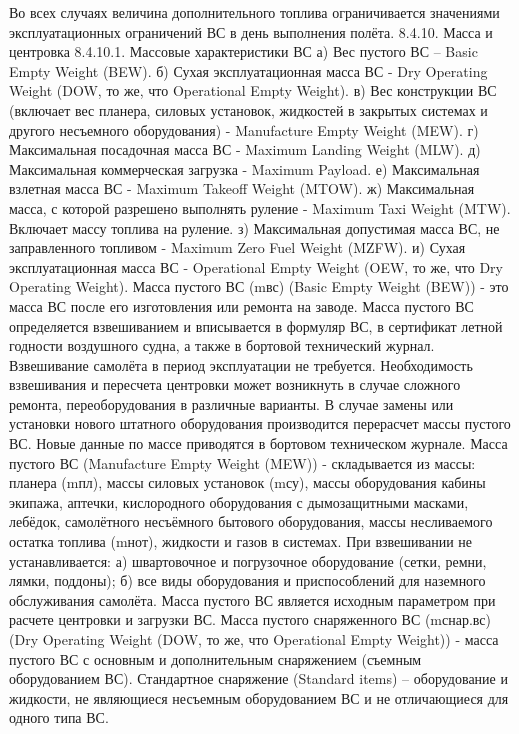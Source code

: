 Во всех случаях величина дополнительного топлива ограничивается значениями эксплуатационных ограничений ВС в день выполнения полёта.
8.4.10. Масса и центровка
8.4.10.1. Массовые характеристики ВС
а)	Вес пустого ВС – Basic Empty Weight (BEW). 
б)	Сухая эксплуатационная масса ВС - Dry Operating Weight (DOW, то же, что Operational Empty Weight). 
в)	Вес конструкции ВС (включает вес планера, силовых установок, жидкостей в закрытых системах и другого несъемного оборудования) - Manufacture Empty Weight (MEW).
г)	Максимальная посадочная масса ВС - Maximum Landing Weight (MLW).
д)	Максимальная коммерческая загрузка - Maximum Payload. 
е)	Максимальная взлетная масса ВС - Maximum Takeoff Weight (MTOW).
ж)	Максимальная масса, с которой разрешено выполнять руление - Maximum Taxi Weight (MTW). 
Включает массу топлива на руление.
з)	Максимальная допустимая масса ВС, не заправленного топливом - Maximum Zero Fuel Weight (MZFW).
и)	Сухая эксплуатационная масса ВС - Operational Empty Weight (OEW, то же, что Dry Operating Weight).
Масса пустого ВС (mвс) (Basic Empty Weight (BEW)) - это масса ВС после его изготовления или ремонта на заводе. Масса пустого ВС определяется взвешиванием и вписывается в формуляр ВС, в сертификат летной годности воздушного судна, а также в бортовой технический журнал. Взвешивание самолёта в период эксплуатации не требуется. Необходимость взвешивания и пересчета центровки может возникнуть в случае сложного ремонта, переоборудования в различные варианты. В случае замены или установки нового штатного оборудования производится перерасчет массы пустого ВС. Новые данные по массе приводятся в бортовом техническом журнале. 
Масса пустого ВС (Manufacture Empty Weight (MEW)) - складывается из массы: планера (mпл), массы силовых установок (mсу), массы оборудования кабины экипажа, аптечки, кислородного оборудования с дымозащитными масками, лебёдок, самолётного несъёмного бытового оборудования, массы несливаемого остатка топлива (mнот), жидкости и газов в системах.
При взвешивании не устанавливается:
а)	швартовочное и погрузочное оборудование (сетки, ремни, лямки, поддоны);
б)	все виды оборудования и приспособлений для наземного обслуживания самолёта. 
Масса пустого ВС является исходным параметром при расчете центровки и загрузки ВС.
Масса пустого снаряженного ВС (mснар.вс) (Dry Operating Weight (DOW, то же, что Operational Empty Weight)) - масса пустого ВС с основным и дополнительным снаряжением (съемным оборудованием ВС).
Стандартное снаряжение (Standard items) – оборудование и жидкости, не являющиеся несъемным оборудованием ВС и не отличающиеся для одного типа ВС.
